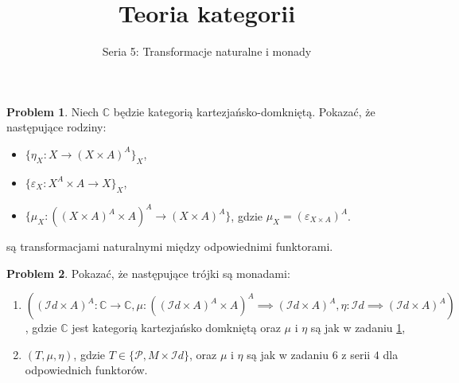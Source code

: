 \documentclass[10pt]{amsart}
\title{Teoria kategorii}
\author{Seria 5: Transformacje naturalne i monady}
\theoremstyle{plain}
\theoremstyle{definition}
\newtheorem{problem}{Problem}
\numberwithin{equation}{section}
\begin{document}
\maketitle
\thispagestyle{empty}

\begin{problem} \label{problem:1}
  Niech $\mathbb{C}$ będzie kategorią kartezjańsko-domkniętą. Pokazać, że następujące rodziny:
  \begin{itemize}
    \item $\{\eta_X: X\to (X\times A)^A\}_X$, 
    \item $\{\varepsilon_X: X^A\times A\to X\}_X$,
    \item $\{\mu_X: \left ( (X\times A)^A \times A\right )^A \to (X\times A)^A \}$, gdzie 
        $\mu_X =  (\varepsilon_{X\times A})^A$. 
  \end{itemize}
  są transformacjami naturalnymi między odpowiednimi funktorami. 
\end{problem} 



\begin{problem} 
Pokazać, że następujące trójki są monadami:
\begin{enumerate}
  \item 
    $((\mathcal{I}d\times A)^A:\mathbb{C}\to \mathbb{C}, 
    \mu: \left ((\mathcal{I}d\times A)^A \times A\right)^A\implies (\mathcal{I}d\times A)^A, 
    \eta: \mathcal{I}d\implies (\mathcal{I}d\times A)^A)
    $, 
    gdzie $\mathbb{C}$ jest kategorią kartezjańsko domkniętą oraz $\mu$ i $\eta$ są jak w zadaniu \ref{problem:1},  
  \item $(T, \mu, \eta)$, gdzie $T\in \{\mathcal{P}, M\times \mathcal{I}d\}$, oraz 
      $\mu$ i $\eta$ są jak w zadaniu $6$ z serii $4$ dla odpowiednich funktorów. 
   
\end{enumerate}
\end{problem}
\end{document}
